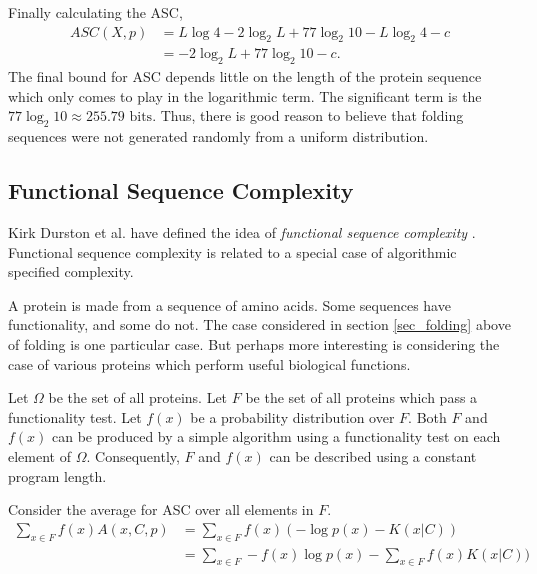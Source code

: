 Finally calculating the ASC,
\begin{align}
    ASC(X,p) &= L \log 4 - 2 \log_2 L + 77 \log_2 10 - L \log_2 4 - c \nonumber \\
    &= - 2 \log_2 L + 77 \log_2 10 - c \mbox{.}
\end{align}
The final bound for ASC depends little on the length of the protein sequence which only comes to play in the logarithmic term.
The significant term is the $77 \log_2 10 \approx 255.79 \mbox{ bits}$.
Thus, there is good reason to believe that folding sequences were not generated randomly from a uniform distribution.

\subsection{Functional Sequence Complexity}
Kirk Durston et al. have defined the idea of {\it functional sequence complexity} .
Functional sequence complexity is related to a special case of algorithmic specified complexity.

A protein is made from a sequence of amino acids.
Some sequences have functionality, and some do not.
The case considered in section \ref{sec_folding} above of folding is one particular case.
But perhaps more interesting is considering the case of various proteins which perform useful biological functions.

Let $\Omega$ be the set of all proteins.
Let $F$ be the set of all proteins which pass a functionality test.
Let $f(x)$ be a probability distribution over $F$.
Both $F$ and $f(x)$ can be produced by a simple algorithm using a functionality test on each element of $\Omega$.
Consequently, $F$ and $f(x)$ can be described using a constant program length.

Consider the average for ASC over all elements in $F$.
\begin{align}
    \label{ASC.FSC.1}
    \sum_{x \in F} f(x) A(x,C,p) 
    &= \sum_{x \in F} f(x) (-\log p(x) - K(x|C))  \nonumber \\
    &= \sum_{x \in F} -f(x)\log p(x) - \sum_{x \in F} f(x) K(x|C))
\end{align}

